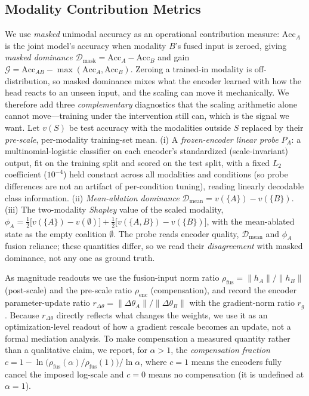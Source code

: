\documentclass[conference]{IEEEtran}
\newcommand{\dom}{\ensuremath{\mathcal{D}}}
\newcommand{\gain}{\ensuremath{\mathcal{G}}}
\newcommand{\rhof}{\ensuremath{\rho_{\mathrm{fus}}}}
\newcommand{\rhoe}{\ensuremath{\rho_{\mathrm{enc}}}}
\newcommand{\updr}{\ensuremath{r_{\Delta\theta}}}
\newcommand{\gradr}{\ensuremath{r_{g}}}
\begin{document}
\subsection{Modality Contribution Metrics}
We use \emph{masked} unimodal accuracy as an operational contribution measure: $\mathrm{Acc}_A$ is the joint model's accuracy when modality $B$'s fused input is zeroed, giving \emph{masked dominance} $\dom_{\mathrm{mask}}=\mathrm{Acc}_A-\mathrm{Acc}_B$ and gain $\gain=\mathrm{Acc}_{AB}-\max(\mathrm{Acc}_A,\mathrm{Acc}_B)$. Zeroing a trained-in modality is off-distribution, so masked dominance mixes what the encoder learned with how the head reacts to an unseen input, and the scaling can move it mechanically. We therefore add three \emph{complementary} diagnostics that the scaling arithmetic alone cannot move---training under the intervention still can, which is the signal we want. Let $v(S)$ be test accuracy with the modalities outside $S$ replaced by their \emph{pre-scale}, per-modality training-set mean. (i) A \emph{frozen-encoder linear probe} $P_A$: a multinomial-logistic classifier on each encoder's standardized (scale-invariant) output, fit on the training split and scored on the test split, with a fixed $L_2$ coefficient ($10^{-4}$) held constant across all modalities and conditions (so probe differences are not an artifact of per-condition tuning), reading linearly decodable class information. (ii) \emph{Mean-ablation dominance} $\dom_{\mathrm{mean}}=v(\{A\})-v(\{B\})$. (iii) The two-modality \emph{Shapley} value of the scaled modality, $\phi_A=\tfrac{1}{2}\bigl[v(\{A\})-v(\emptyset)\bigr]+\tfrac{1}{2}\bigl[v(\{A,B\})-v(\{B\})\bigr]$, with the mean-ablated state as the empty coalition $\emptyset$. The probe reads encoder quality, $\dom_{\mathrm{mean}}$ and $\phi_A$ fusion reliance; these quantities differ, so we read their \emph{disagreement} with masked dominance, not any one as ground truth.

As magnitude readouts we use the fusion-input norm ratio $\rhof=\lVert h_A\rVert/\lVert h_B\rVert$ (post-scale) and the pre-scale ratio $\rhoe$ (compensation), and record the encoder parameter-update ratio $\updr=\lVert\Delta\theta_A\rVert/\lVert\Delta\theta_B\rVert$ with the gradient-norm ratio $\gradr$. Because $\updr$ directly reflects what changes the weights, we use it as an optimization-level readout of how a gradient rescale becomes an update, not a formal mediation analysis. To make compensation a measured quantity rather than a qualitative claim, we report, for $\alpha>1$, the \emph{compensation fraction} $c=1-\ln\!\big(\rhof(\alpha)/\rhof(1)\big)/\ln\alpha$, where $c{=}1$ means the encoders fully cancel the imposed log-scale and $c{=}0$ means no compensation (it is undefined at $\alpha{=}1$).
\end{document}
